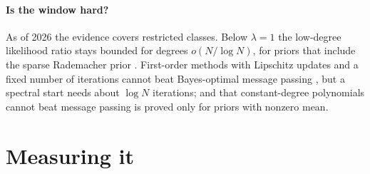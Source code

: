 \begin{refsection}
\paragraph{Is the window hard?} As of 2026 the evidence covers restricted classes. Below $\lambda=1$ the low-degree likelihood ratio stays bounded for degrees $o(N/\log N)$, for priors that include the sparse Rademacher prior \parencite[Theorem~3.9 of arXiv v1]{KuniskyWeinBandeira2022}. First-order methods with Lipschitz updates and a fixed number of iterations cannot beat Bayes-optimal message passing \parencite{CelentanoMontanariWu2020}, but a spectral start needs about $\log N$ iterations; and that constant-degree polynomials cannot beat message passing is proved \parencite{MontanariWein2025} only for priors with nonzero mean.

\section{Measuring it}\label{sec:spiked:measuring}


\end{refsection}
